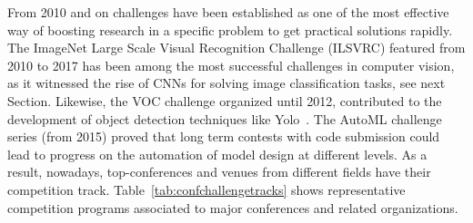 \documentclass[twoside,11pt]{article}
\begin{document}
From 2010 and on challenges have been established as one of the most effective way of boosting research in a specific problem to get practical solutions rapidly. 
The ImageNet Large Scale Visual Recognition Challenge (ILSVRC) featured from 2010 to 2017 has been among the most successful challenges in computer vision, as it witnessed the rise of CNNs for solving image classification tasks, see next Section. Likewise, the VOC challenge organized until 2012, contributed to the development of object detection techniques like Yolo~\citep{DBLP:conf/cvpr/RedmonDGF16}.  The AutoML challenge series (from 2015) proved that long term contests with code submission could lead to progress on the automation of model design at different levels. As a result, nowadays, top-conferences and venues from different fields have their competition track. Table~\ref{tab:confchallengetracks} shows representative competition programs  associated to major conferences and related organizations. 
\end{document}
